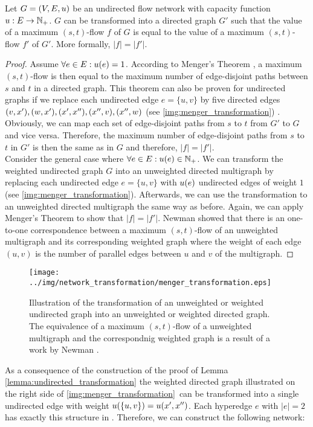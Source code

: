 \begin{lemma}
\label{lemma:undirected_transformation}
Let $G = (V,E,u)$ be an undirected flow network with capacity function $u: E \rightarrow \mathbb{N}_+$.
$G$ can be transformed into a directed graph $G'$ such that the value of a maximum $(s,t)$-flow $f$ of $G$
is equal to the value of a maximum $(s,t)$-flow $f'$ of $G'$. More formally, $|f| = |f'|$.
\end{lemma}

\begin{proof}
Assume $\forall e \in E: u(e) = 1$. According to Menger's Theorem \cite{menger1927allgemeinen},
a maximum $(s,t)$-flow is then equal to the maximum number of edge-disjoint paths between 
$s$ and $t$ in a directed graph.
This theorem can also be proven for undirected graphs if we replace each undirected edge
$e = \{u,v\}$ by five directed edges $(v,x'),(w,x'),(x',x''),(x'',v),(x'',w)$ (see \autoref{img:menger_transformation})
\cite{menger1927allgemeinen}. Obviously, we can map each set of edge-disjoint paths from $s$ to $t$ from $G'$ to $G$
and vice versa. Therefore, the maximum number of edge-disjoint paths from $s$ to $t$ in
$G'$ is then the same as in $G$ and therefore, $|f| = |f'|$. \\
Consider the general case where $\forall e \in E: u(e) \in \mathbb{N}_+$. We can transform the
weighted undirected graph $G$ into an unweighted directed multigraph by replacing each undirected
edge $e = \{u,v\}$ with $u(e)$ undirected edges of weight $1$ (see \autoref{img:menger_transformation}).
Afterwards, we can use the transformation to an unweighted directed multigraph the same way as before.
Again, we can apply Menger's Theorem to show that $|f| = |f'|$. Newman \cite{newman2004analysis}
showed that there is an one-to-one correspondence between a maximum $(s,t)$-flow of an unweighted multigraph
and its corresponding weighted graph where the weight of each edge $(u,v)$ is the number of parallel
edges between $u$ and $v$ of the multigraph.
\end{proof}

\begin{figure}[h]
\centering
\texttt{[image: ../img/network\_transformation/menger\_transformation.eps]}
\caption{Illustration of the transformation of an unweighted or weighted undirected graph into
         an unweighted or weighted directed graph. The equivalence of a maximum $(s,t)$-flow
         of a unweighted multigraph and the correspondnig weighted graph is a result of 
         a work by Newman \cite{newman2004analysis}.}
\label{img:menger_transformation}
\end{figure}
\clearpage
As a consequence of the construction of the proof of Lemma \ref{lemma:undirected_transformation}
the weighted directed graph illustrated on the right side of
\autoref{img:menger_transformation}~can be transformed into a single undirected edge with weight
$u(\{u,v\}) = u(x',x'')$.
Each hyperedge $e$ with $|e| = 2$ has exactly this structure in . Therefore, we can 
construct the following network:

